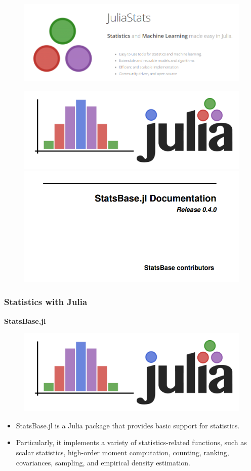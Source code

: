 \documentclass[Master.tex]{subfiles}
\begin{document}
\begin{frame}
\begin{figure}
\centering
\includegraphics[width=1.05\linewidth]{images/StatsBase-ScreenShot}

\end{figure}


\end{frame}
\begin{frame}
\begin{figure}
\centering
\includegraphics[width=0.4\linewidth]{images/statsbase-logo}

\includegraphics[width=0.8\linewidth]{images/statsbase-docs}

\end{figure}

\end{frame}
\begin{frame}[fragile]
\frametitle{Statistics with Julia}	
\large
\noindent \textbf{StatsBase.jl}
\begin{figure}
	\centering
	\includegraphics[width=0.4\linewidth]{images/statsbase-logo}
	
\end{figure}
\begin{itemize}
	\item StatsBase.jl is a Julia package that provides basic support for statistics. 
	\item Particularly, it implements a variety of statistics-related functions, such as scalar statistics, high-order moment computation, counting, ranking, covariances, sampling, and empirical density estimation.
\end{itemize}
\end{frame}
\end{document}
